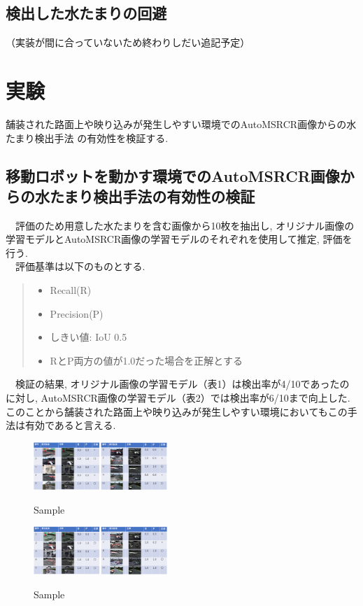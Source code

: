 \documentclass[10pt]{jarticle}
\begin{document}
    \subsection{検出した水たまりの回避}
    （実装が間に合っていないため終わりしだい追記予定）

    \section{実験}%
    舗装された路面上や映り込みが発生しやすい環境でのAutoMSRCR画像からの水たまり検出手法
    の有効性を検証する. 
    \subsection{移動ロボットを動かす環境でのAutoMSRCR画像からの水たまり検出手法の有効性の検証}
    　評価のため用意した水たまりを含む画像から10枚を抽出し, 
    オリジナル画像の学習モデルとAutoMSRCR画像の学習モデルのそれぞれを使用して推定, 評価を行う. \\
    　評価基準は以下のものとする. 
    \begin{quote}
        \begin{itemize}
         \item Recall(R) 
         \item Precision(P) 
         \item しきい値: IoU 0.5
         \item RとP両方の値が1.0だった場合を正解とする
         
        \end{itemize}
       \end{quote}
    　検証の結果, オリジナル画像の学習モデル（表1）は検出率が4/10であったのに対し, 
    AutoMSRCR画像の学習モデル（表2）では検出率が6/10まで向上した. 
    このことから舗装された路面上や映り込みが発生しやすい環境においてもこの手法は有効であると言える. 

    \begin{center}
        \begin{figure}[H]
            \caption{Sample}
            \includegraphics[width=0.45\textwidth]{./fig/fig3.png}
            \label{fig:sample-fig}
        \end{figure}
    \end{center}
    \begin{center}
        \begin{figure}[H]
            \caption{Sample}
            \includegraphics[width=0.45\textwidth]{./fig/fig4.png}
            \label{fig:sample-fig}
        \end{figure}
    \end{center}
\end{document}
